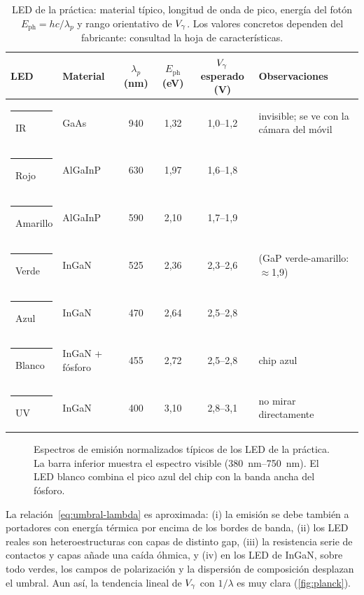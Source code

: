 \documentclass[11pt,a4paper]{article}
\begin{document}
\begin{table}[htbp]
  \centering\small
  \caption{LED de la práctica: material típico, longitud de onda de pico,
  energía del fotón $E_{\text{ph}}=hc/\lambda_p$ y rango orientativo de
  $V_{\gamma}$. Los valores concretos dependen del fabricante: consultad la hoja de
  características.}
  \label{tab:leds}
  \renewcommand{\arraystretch}{1.2}
  \begin{tabular}{@{}l l c c c l@{}}
    \toprule
    \textbf{LED} & \textbf{Material} & $\lambda_p$ (nm) & $E_{\text{ph}}$ (eV)
      & $V_{\gamma}$ esperado (V) & \textbf{Observaciones}\\
    \midrule
    {\color{cIR}\rule{1.4ex}{1.4ex}}\ IR       & GaAs        & 940 & 1,32 & 1,0--1,2 & invisible; se ve con la cámara del móvil\\
    {\color{cRojo}\rule{1.4ex}{1.4ex}}\ Rojo     & AlGaInP     & 630 & 1,97 & 1,6--1,8 & \\
    {\color{cAmarillo}\rule{1.4ex}{1.4ex}}\ Amarillo & AlGaInP     & 590 & 2,10 & 1,7--1,9 & \\
    {\color{cVerde}\rule{1.4ex}{1.4ex}}\ Verde    & InGaN       & 525 & 2,36 & 2,3--2,6 & (GaP verde-amarillo: $\approx$1,9)\\
    {\color{cAzul}\rule{1.4ex}{1.4ex}}\ Azul     & InGaN       & 470 & 2,64 & 2,5--2,8 & \\
    {\color{cBlanco}\rule{1.4ex}{1.4ex}}\ Blanco   & InGaN + fósforo & 455 & 2,72 & 2,5--2,8 & chip azul\\
    {\color{cUV}\rule{1.4ex}{1.4ex}}\ UV       & InGaN       & 400 & 3,10 & 2,8--3,1 & no mirar directamente\\
    \bottomrule
  \end{tabular}
\end{table}

\begin{figure}[htbp]
  \centering
  
  \caption{Espectros de emisión normalizados típicos de los LED de la práctica.
  La barra inferior muestra el espectro visible (\SIrange{380}{750}{nm}). El
  LED blanco combina el pico azul del chip con la banda ancha del fósforo.}
  \label{fig:espectros}
\end{figure}

\begin{observacion}\label{obs:desv}
  La relación~\eqref{eq:umbral-lambda} es aproximada: (i) la emisión se debe
  también a portadores con energía térmica por encima de los bordes de banda,
  (ii) los LED reales son heteroestructuras con capas de distinto gap, (iii)
  la resistencia serie de contactos y capas añade una caída óhmica, y (iv) en
  los LED de InGaN, sobre todo verdes, los campos de polarización y la
  dispersión de composición desplazan el umbral. Aun así, la tendencia lineal
  de $V_{\gamma}$ con $1/\lambda$ es muy clara (\cref{fig:planck}).
\end{observacion}
\end{document}
